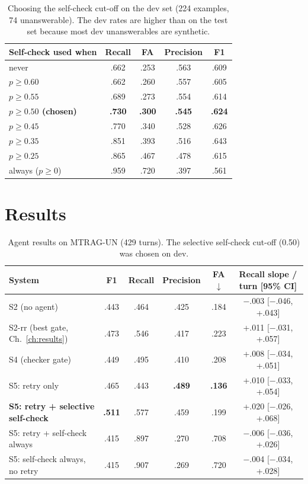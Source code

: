 \documentclass[11pt,a4paper]{report}
\newcommand{\sys}[1]{\textsf{#1}}
\begin{document}
\begin{table}[H]
\centering\small
\begin{tabular}{@{}lcccc@{}}
\toprule
Self-check used when & Recall & FA & Precision & F1 \\
\midrule
never & .662 & .253 & .563 & .609 \\
$p \ge 0.60$ & .662 & .260 & .557 & .605 \\
$p \ge 0.55$ & .689 & .273 & .554 & .614 \\
\textbf{$p \ge 0.50$ (chosen)} & \textbf{.730} & \textbf{.300} & \textbf{.545} & \textbf{.624} \\
$p \ge 0.45$ & .770 & .340 & .528 & .626 \\
$p \ge 0.35$ & .851 & .393 & .516 & .643 \\
$p \ge 0.25$ & .865 & .467 & .478 & .615 \\
always ($p \ge 0$) & .959 & .720 & .397 & .561 \\
\bottomrule
\end{tabular}
\caption{Choosing the self-check cut-off on the dev set (224 examples, 74 unanswerable). The dev rates are higher than on the test set because most dev unanswerables are synthetic.}
\label{tab:calib}
\end{table}

\section{Results}
\begin{table}[H]
\centering\small
\setlength{\tabcolsep}{4pt}
\begin{tabular}{@{}lccccc@{}}
\toprule
System & F1 & Recall & Precision & FA $\downarrow$ & Recall slope / turn [95\% CI] \\
\midrule
\sys{S2} (no agent) & .443 & .464 & .425 & .184 & $-$.003 [$-$.046, +.043] \\
\sys{S2-rr} (best gate, Ch.~\ref{ch:results}) & .473 & .546 & .417 & .223 & +.011 [$-$.031, +.057] \\
\sys{S4} (checker gate) & .449 & .495 & .410 & .208 & +.008 [$-$.034, +.051] \\
\midrule
\sys{S5}: retry only & .465 & .443 & \textbf{.489} & \textbf{.136} & +.010 [$-$.033, +.054] \\
\textbf{\sys{S5}: retry + selective self-check} & \textbf{.511} & .577 & .459 & .199 & +.020 [$-$.026, +.068] \\
\sys{S5}: retry + self-check always & .415 & .897 & .270 & .708 & $-$.006 [$-$.036, +.026] \\
\sys{S5}: self-check always, no retry & .415 & .907 & .269 & .720 & $-$.004 [$-$.034, +.028] \\
\bottomrule
\end{tabular}
\caption{Agent results on MTRAG-UN (429 turns). The selective self-check cut-off (0.50) was chosen on dev.}
\label{tab:agent}
\end{table}
\end{document}
